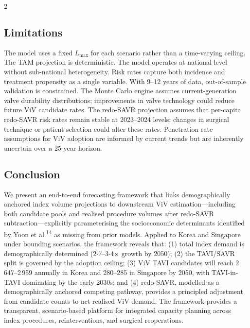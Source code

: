 \documentclass[10pt, a4paper]{article}
\begin{document}
\begin{multicols}{2}
\subsection{Limitations}

The model uses a fixed $L_{\max}$ for each scenario rather than a time-varying ceiling. The TAM projection is deterministic. The model operates at national level without sub-national heterogeneity. Risk rates capture both incidence and treatment propensity as a single variable. With 9--12 years of data, out-of-sample validation is constrained. The Monte Carlo engine assumes current-generation valve durability distributions; improvements in valve technology could reduce future ViV candidate rates. The redo-SAVR projection assumes that per-capita redo-SAVR risk rates remain stable at 2023--2024 levels; changes in surgical technique or patient selection could alter these rates. Penetration rate assumptions for ViV adoption are informed by current trends but are inherently uncertain over a 25-year horizon.

\subsection{Conclusion}

We present an end-to-end forecasting framework that links demographically anchored index volume projections to downstream ViV estimation---including both candidate pools and realised procedure volumes after redo-SAVR subtraction---explicitly parameterising the socioeconomic determinants identified by Yoon et al.\textsuperscript{14} as missing from prior models. Applied to Korea and Singapore under bounding scenarios, the framework reveals that: (1) total index demand is demographically determined (2$\cdot$7--3$\cdot$4$\times$ growth by 2050); (2) the TAVI/SAVR split is governed by the adoption ceiling; (3) ViV TAVI candidates will reach 2\,647--2\,959 annually in Korea and 280--285 in Singapore by 2050, with TAVI-in-TAVI dominating by the early 2030s; and (4) redo-SAVR, modelled as a demographically anchored competing pathway, provides a principled adjustment from candidate counts to net realised ViV demand. The framework provides a transparent, scenario-based platform for integrated capacity planning across index procedures, reinterventions, and surgical reoperations.

\end{multicols}

\vspace{12pt}
\end{document}
